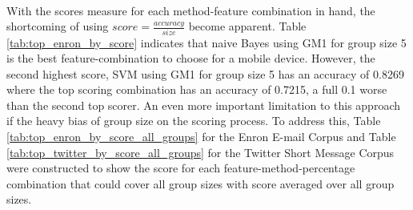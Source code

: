 \paragraph{} With the scores measure for each method-feature combination in hand, the shortcoming of using $score = \frac{accuracy}{size}$ become apparent.  Table \ref{tab:top_enron_by_score} indicates that naive Bayes using GM1 for group size 5 is the best feature-combination to choose for a mobile device.  However, the second highest score, SVM using GM1 for group size 5 has an accuracy of 0.8269 where the top scoring combination has an accuracy of 0.7215, a full 0.1 worse than the second top scorer.  An even more important limitation to this approach if the heavy bias of group size on the scoring process.  To address this, Table \ref{tab:top_enron_by_score_all_groups} for the Enron E-mail Corpus and Table \ref{tab:top_twitter_by_score_all_groups} for the Twitter Short Message Corpus were constructed to show the score for each feature-method-percentage combination that could cover all group sizes with score averaged over all group sizes.

